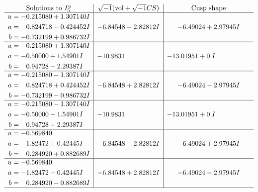 \documentclass[1p]{elsarticle_modified}
\theoremstyle{definition}
\newcommand{\I}{\sqrt{-1}}
\begin{document}
$$\begin{array}{c|c|c}  
\text{Solutions to }I^u_{5}& \I (\text{vol} + \sqrt{-1}CS) & \text{Cusp shape}\\
 \hline 
\begin{aligned}
u &= -0.215080 + 1.307140 I \\
a &= \phantom{-}0.824718 - 0.424452 I \\
b &= -0.732199 + 0.986732 I\end{aligned}
 & -6.84548 - 2.82812 I & -6.49024 + 2.97945 I \\ \hline\begin{aligned}
u &= -0.215080 + 1.307140 I \\
a &= -0.50000 + 1.54901 I \\
b &= \phantom{-}0.94728 - 2.29387 I\end{aligned}
 & -10.9831\phantom{ +0.000000I} & -13.01951 + 0. I\phantom{ +0.000000I} \\ \hline\begin{aligned}
u &= -0.215080 - 1.307140 I \\
a &= \phantom{-}0.824718 + 0.424452 I \\
b &= -0.732199 - 0.986732 I\end{aligned}
 & -6.84548 + 2.82812 I & -6.49024 - 2.97945 I \\ \hline\begin{aligned}
u &= -0.215080 - 1.307140 I \\
a &= -0.50000 - 1.54901 I \\
b &= \phantom{-}0.94728 + 2.29387 I\end{aligned}
 & -10.9831\phantom{ +0.000000I} & -13.01951 + 0. I\phantom{ +0.000000I} \\ \hline\begin{aligned}
u &= -0.569840\phantom{ +0.000000I} \\
a &= -1.82472 + 0.42445 I \\
b &= \phantom{-}0.284920 + 0.882689 I\end{aligned}
 & -6.84548 - 2.82812 I & -6.49024 + 2.97945 I \\ \hline\begin{aligned}
u &= -0.569840\phantom{ +0.000000I} \\
a &= -1.82472 - 0.42445 I \\
b &= \phantom{-}0.284920 - 0.882689 I\end{aligned}
 & -6.84548 + 2.82812 I & -6.49024 - 2.97945 I\\
 \hline 
 \end{array}$$\newpage\newpage\renewcommand{\arraystretch}{1}
\end{document}
